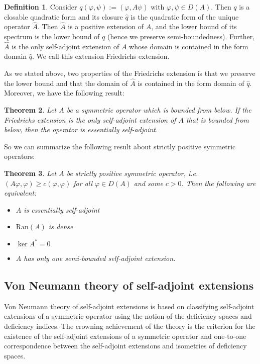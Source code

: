 \documentclass[11pt, a4paper, german]{article}
\theoremstyle{plain}
\newtheorem{theorem}{Theorem}
\theoremstyle{definition}
\newtheorem{definition}[theorem]{Definition}
\theoremstyle{remark}
\numberwithin{equation}{section}
\numberwithin{theorem}{section}
\begin{document}
\begin{definition}
Consider $q(\varphi, \psi) := (\varphi, A\psi)$ with $\varphi, \psi \in D(A)$. Then $q$ is a closable quadratic form and its closure $\widehat{q}$ is the quadratic form of the unique operator $\widehat{A}$. Then $\widehat{A}$ is a positive extension of $A$, and the lower bound of its spectrum is the lower bound of $q$ (hence we preserve semi-boundedness). Further, $\widehat{A}$ is the only self-adjoint extension of $A$ whose domain is contained in the form domain $\widehat{q}$. We call this extension Friedrichs extension.
\end{definition}

As we stated above, two properties of the Friedrichs extension is that we preserve the lower bound and that the domain of $\widehat{A}$ is contained in the form domain of $\widehat{q}$. Moreover, we have the following result:

\begin{theorem}
Let $A$ be a symmetric operator which is bounded from below. If the Friedrichs extension is the only self-adjoint extension of $A$ that is bounded from below, then the operator is essentially self-adjoint.
\end{theorem}

So we can summarize the following result about strictly positive symmetric operators:

\begin{theorem}

Let $A$ be strictly positive symmetric operator, i.e. $(A\varphi, \varphi) \geq c(\varphi, \varphi)$ for all $\varphi \in D(A)$ and some $c > 0$. Then the following are equivalent:

\begin{itemize}
\item $A$ is essentially self-adjoint
\item $\text{Ran}(A)$ is dense
\item $\ker	A^* = 0$
\item $A$ has only one semi-bounded self-adjoint extension.
\end{itemize}

\end{theorem}


\subsection{Von Neumann theory of self-adjoint extensions}

Von Neumann theory of self-adjoint extensions is based on classifying self-adjoint extensions of a symmetric operator using the notion of the deficiency spaces and deficiency indices. The crowning achievement of the theory is the criterion for the existence of the self-adjoint extensions of a symmetric operator and one-to-one correspondence between the self-adjoint extensions and isometries of deficiency spaces.
\end{document}
